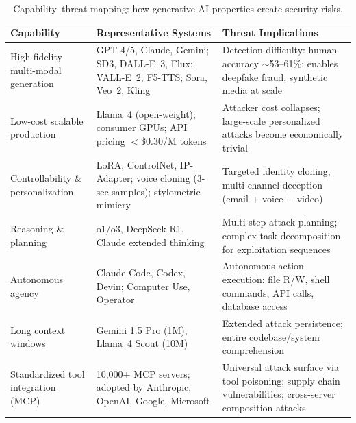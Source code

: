 \begin{table}[htbp]
\centering
\caption{Capability--threat mapping: how generative AI properties create security risks.}
\label{tab:cap-threat}
\small
\begin{tabular}{p{3.2cm}p{4.2cm}p{5.5cm}}
\toprule
\textbf{Capability} & \textbf{Representative Systems} & \textbf{Threat Implications} \\
\midrule
High-fidelity multi-modal generation &
GPT-4/5, Claude, Gemini; SD3, DALL-E~3, Flux; VALL-E~2, F5-TTS; Sora, Veo~2, Kling &
Detection difficulty: human accuracy $\sim$53--61\%; enables deepfake fraud, synthetic media at scale \\
\addlinespace
Low-cost scalable production &
Llama~4 (open-weight); consumer GPUs; API pricing $<$\$0.30/M tokens &
Attacker cost collapses; large-scale personalized attacks become economically trivial \\
\addlinespace
Controllability \& personalization &
LoRA, ControlNet, IP-Adapter; voice cloning (3-sec samples); stylometric mimicry &
Targeted identity cloning; multi-channel deception (email + voice + video) \\
\addlinespace
Reasoning \& planning &
o1/o3, DeepSeek-R1, Claude extended thinking &
Multi-step attack planning; complex task decomposition for exploitation sequences \\
\addlinespace
Autonomous agency &
Claude Code, Codex, Devin; Computer Use, Operator &
Autonomous action execution: file R/W, shell commands, API calls, database access \\
\addlinespace
Long context windows &
Gemini 1.5 Pro (1M), Llama~4 Scout (10M) &
Extended attack persistence; entire codebase/system comprehension \\
\addlinespace
Standardized tool integration (MCP) &
10,000+ MCP servers; adopted by Anthropic, OpenAI, Google, Microsoft &
Universal attack surface via tool poisoning; supply chain vulnerabilities; cross-server composition attacks \\
\bottomrule
\end{tabular}
\end{table}
